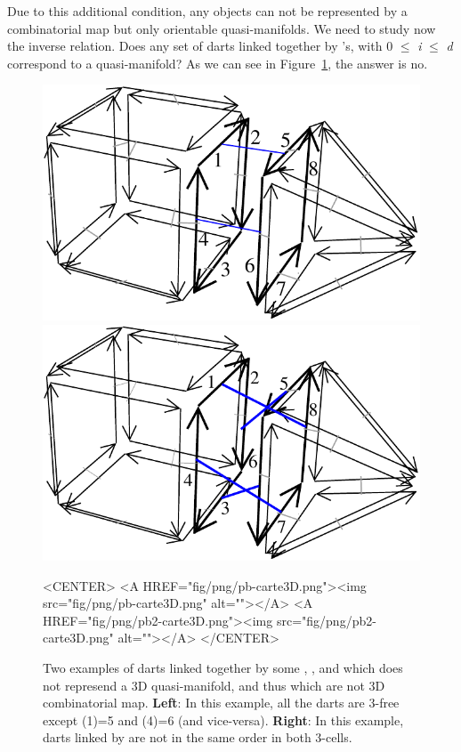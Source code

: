 Due to this additional condition, any objects can not be represented
by a combinatorial map but only orientable quasi-manifolds. We need to
study now the inverse relation. Does any set of darts linked together by
\betai{}'s, with 0 $\leq$ \emph{i} $\leq$ \emph{d} correspond to a quasi-manifold?  As
we can see in Figure~\ref{fig-pb-carte}, the answer is no.
%
\begin{figure}[ht]
  \begin{ccTexOnly}
    \begin{center}
      \includegraphics[width=.4\textwidth]
      {Combinatorial_map/fig/pdf/pb-carte3D}
      \qquad
      \includegraphics[width=.4\textwidth]
      {Combinatorial_map/fig/pdf/pb2-carte3D}
    \end{center}
  \end{ccTexOnly}
  \begin{ccHtmlOnly}
    <CENTER>
    <A HREF="fig/png/pb-carte3D.png"><img src="fig/png/pb-carte3D.png" alt=""></A>
    <A HREF="fig/png/pb2-carte3D.png"><img src="fig/png/pb2-carte3D.png" alt=""></A>
    </CENTER>
    \end{ccHtmlOnly}
    \caption{Two examples of darts linked together by some \betazero{},
      \betaun{}, \betadeux{} and \betatrois{} which does not represend a 3D
      quasi-manifold, and thus which are not 3D combinatorial map. 
      \textbf{Left}: In this example, all the darts are 3-free except
      \betatrois{}(1)=5 and \betatrois{}(4)=6 (and vice-versa).
      \textbf{Right}: In this example, darts linked by \betatrois{} 
      are not in the same order in both 3-cells.
    }
    \label{fig-pb-carte}
\end{figure}

